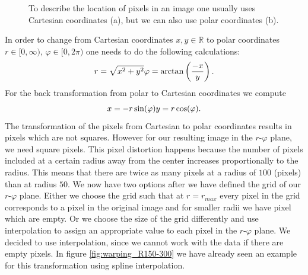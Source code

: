 \begin{figure}[H]
	\centering
\caption{To describe the location of pixels in an image one usually uses Cartesian coordinates (a), but we can also use polar coordinates (b).}
\label{fig:CoorinateSystems}
\end{figure}
In order to change from Cartesian coordinates $x, y \in \mathbb{R}$ to polar coordinates $r \in [0, \infty)$, $\varphi \in [0, 2\pi)$ one needs to do the following calculations:
\begin{equation}
	r = \sqrt{x^2 + y^2}\\
	\varphi = \arctan \left( \frac{-x}{y} \right).
\end{equation}
For the back transformation from polar to Cartesian coordinates we compute
\begin{equation}
	x = -r \sin(\varphi)\\
	y = r \cos(\varphi).
\end{equation}
The transformation of the pixels from Cartesian to polar coordinates results in pixels which are not squares. However for our resulting image in the $r$-$\varphi$ plane, we need square pixels. This pixel distortion happens because the number of pixels included at a certain radius away from the center increases proportionally to the radius. This means that there are twice as many pixels at a radius of $100$ (pixels) than at radius $50$. We now have two options after we have defined the grid of our $r$-$\varphi$ plane. Either we choose the grid such that at $r=r_{max}$ every pixel in the grid corresponds to a pixel in the original image and for smaller radii we have pixel which are empty. Or we choose the size of the grid differently and use interpolation to assign an appropriate value to each pixel in the $r$-$\varphi$ plane. We decided to use interpolation, since we cannot work with the data if there are empty pixels. In figure \ref{fig:warping_R150-300} we have already seen an example for this transformation using spline interpolation.\\
